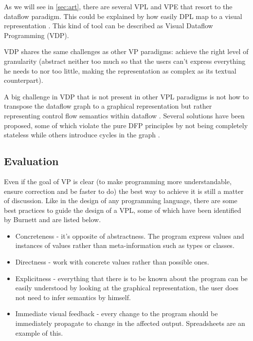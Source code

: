 \begin{itemsize}
As we will see in \ref{sec:art}, there are several VPL and VPE that resort to the
dataflow paradigm. This could be explained by how easily DPL map to
a visual representation \cite{Johnston2004}. This kind of tool can be described
as Visual Dataflow Programming (VDP).

VDP shares the same challenges as other VP paradigms: achieve the right level
of granularity (abstract neither too much so that the users can't express everything
he needs to nor too little, making the representation as complex as its textual
counterpart).

A big challenge in VDP that is not present in other VPL paradigms
is not how to transpose the dataflow graph to a graphical
representation but rather representing control flow semantics within dataflow
\cite{Cox2011}. Several solutions have been proposed, some of which violate
the pure DFP principles by not being completely stateless while others introduce
cycles in the graph \cite{Mosconi2000}.

\subsection{Evaluation}
\label{sec:eval}

Even if the goal of VP is clear (to make programming more understandable, ensure
correction and be faster to do) the best way to achieve it is still a matter of
discussion. Like in the design of any programming language, there are some
best practices to guide the design of a VPL, some of which have been identified
by Burnett \cite{Burnett1999} and are listed below.

\begin{itemize}
  \item Concreteness - it's opposite of abstractness. The program express values
and instances of values rather than meta-information such as types or classes.
  \item Directness - work with concrete values rather than possible ones.
  \item Explicitness - everything that there is to be known about the program
can be easily understood by looking at the graphical representation, the
user does not need to infer semantics by himself.
  \item Immediate visual feedback - every change to the program should be
immediately propagate to change in the affected output. Spreadsheets are an example of
this.
\end{itemize}


\end{itemsize}
